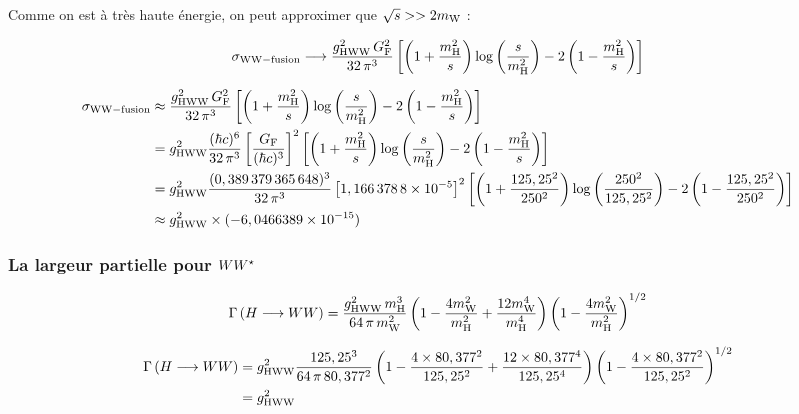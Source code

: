 Comme on est à très haute énergie, on peut approximer que $ \sqrt{s} >> 2 m_\mathrm{W} $ :

\begin{equation}
	\sigma_\mathrm{WW-fusion} \longrightarrow 
		\frac{g_\mathrm{HWW}^2 \, G_\mathrm{F}^2}{32 \, \pi^3}
		\left[
			\left(1 + \frac{m_\mathrm{H}^2}{s}\right) \log\left(\frac{s}{m_\mathrm{H}^2}\right)
			- 2 \left(1 - \frac{m_\mathrm{H}^2}{s}\right)
		\right]
\end{equation}


\begin{align*}
	\sigma_\mathrm{WW-fusion}
		&\approx\frac{g_\mathrm{HWW}^2 \, G_\mathrm{F}^2}{32 \, \pi^3}
		\left[
			\left(1 + \frac{m_\mathrm{H}^2}{s}\right) \log\left(\frac{s}{m_\mathrm{H}^2}\right)
			- 2 \left(1 - \frac{m_\mathrm{H}^2}{s}\right)
		\right]\\
		&=g_\mathrm{HWW}^2\frac{(\hbar c)^6}{32 \, \pi^3}
		\left[\frac{G_\mathrm{F}}{(\hbar c)^3}\right]^2
		\left[
			\left(1 + \frac{m_\mathrm{H}^2}{s}\right) \log\left(\frac{s}{m_\mathrm{H}^2}\right)
			- 2 \left(1 - \frac{m_\mathrm{H}^2}{s}\right)
		\right]\\
		&=g_\mathrm{HWW}^2\frac{(0,389\,379\,365\,648)^3}{32 \, \pi^3}
		\left[1,166\,378\,8 \times 10^{-5}\right]^2
		\left[
			\left(1 + \frac{125,25^2}{250^2}\right) \log\left(\frac{250^2}{125,25^2}\right)
			- 2 \left(1 - \frac{125,25^2}{250^2}\right)
		\right]\\
		&\approx g_\mathrm{HWW}^2 \times (-6,0466389\times 10^{-15})
\end{align*}


\subsubsection{La largeur partielle pour $WW^{\star}$ \cite{desy}}

\begin{equation}
	\Gamma\left(H\longrightarrow WW\right) = 
		\frac{g_\mathrm{HWW}^2 \, m_\mathrm{H}^3}{64 \, \pi \, m_\mathrm{W}^2}
		\left(1 - \frac{4 m_\mathrm{W}^2}{m_\mathrm{H}^2} + \frac{12 m_\mathrm{W}^4}{m_\mathrm{H}^4}\right)
		\left(1 - \frac{4 m_\mathrm{W}^2}{m_\mathrm{H}^2}\right)^{1/2}
\end{equation}

\begin{align*}
	\Gamma\left(H\longrightarrow WW\right) 
	&= g_\mathrm{HWW}^2
		\frac{125,25^3}{64 \, \pi \, 80,377^2}
		\left(1 - \frac{4\times 80,377^2}{125,25^2} + \frac{12\times 80,377^4}{125,25^4}\right)
		\left(1 - \frac{4\times 80,377^2}{125,25^2}\right)^{1/2}\\
	&= g_\mathrm{HWW}^2 
\end{align*}


